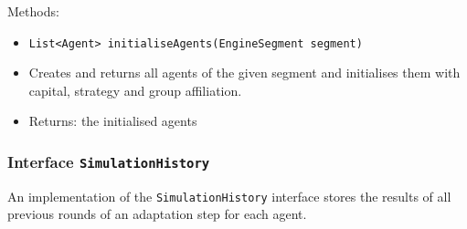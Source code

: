 \documentclass[parskip=full,11pt]{scrartcl}
\begin{document}
Methods:
\begin{itemize}\itemsep -10pt
\item \texttt{List<Agent> initialiseAgents(EngineSegment segment)}
\item[] Creates and returns all agents of the given segment and initialises them with capital, strategy and group affiliation.
\item[] Returns: the initialised agents
\end{itemize}

\subsubsection{Interface \texttt{SimulationHistory}}
An implementation of the \texttt{SimulationHistory} interface stores the results of all previous rounds of an adaptation step for each agent.
\end{document}

